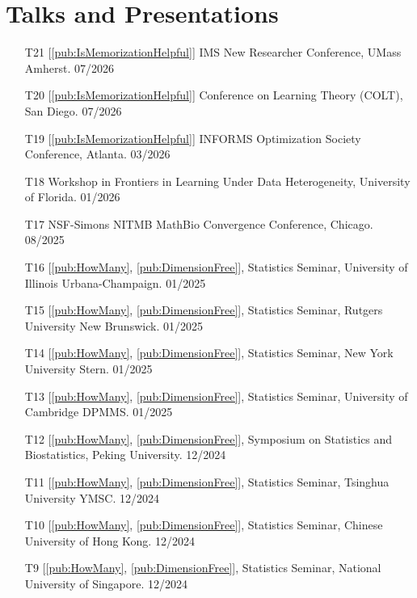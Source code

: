 \documentclass[10pt, a4paper]{article}
\makeatletter
\newcommand{\cvdategap}{\hspace{1.5em}\hfill}
\def\namedlabel#1#2{\begingroup
	#2%
	\def\@currentlabel{#2}%
	\phantomsection\label{#1}\endgroup
}
\makeatother
\begin{document}
\section*{\textbf{Talks and Presentations}}
\begin{enumerate}
	\item[\namedlabel{talk:IMS-26-4}{T21}] [\ref{pub:IsMemorizationHelpful}] IMS New Researcher Conference, UMass Amherst. \cvdategap 07/2026
	\item[\namedlabel{talk:COLT-26-3}{T20}] [\ref{pub:IsMemorizationHelpful}] Conference on Learning Theory (COLT), San Diego. \cvdategap 07/2026
	\item[\namedlabel{talk:IOC-26-2}{T19}] [\ref{pub:IsMemorizationHelpful}] INFORMS Optimization Society Conference, Atlanta. \cvdategap 03/2026
	\item[\namedlabel{talk:UF-26-1}{T18}] Workshop in Frontiers in Learning Under Data Heterogeneity, University of Florida. \cvdategap 01/2026
	\item[\namedlabel{talk:NITMB-25-8}{T17}] NSF-Simons NITMB MathBio Convergence Conference, Chicago. \cvdategap 08/2025
	\item[\namedlabel{talk:UIUC-25-1}{T16}] [\ref{pub:HowMany}, \ref{pub:DimensionFree}], Statistics Seminar, University of Illinois Urbana-Champaign. \cvdategap 01/2025
	\item[\namedlabel{talk:Rutgers-25-1}{T15}] [\ref{pub:HowMany}, \ref{pub:DimensionFree}], Statistics Seminar, Rutgers University New Brunswick. \cvdategap 01/2025
	\item[\namedlabel{talk:NYU-25-1}{T14}] [\ref{pub:HowMany}, \ref{pub:DimensionFree}], Statistics Seminar, New York University Stern. \cvdategap 01/2025
	\item[\namedlabel{talk:Cambridge-25-1}{T13}] [\ref{pub:HowMany}, \ref{pub:DimensionFree}], Statistics Seminar, University of Cambridge DPMMS. \cvdategap 01/2025
	\item[\namedlabel{talk:PKU-24-1}{T12}] [\ref{pub:HowMany}, \ref{pub:DimensionFree}], Symposium on Statistics and Biostatistics, Peking University. \cvdategap 12/2024
	\item[\namedlabel{talk:THU-24-1}{T11}] [\ref{pub:HowMany}, \ref{pub:DimensionFree}], Statistics Seminar, Tsinghua University YMSC. \cvdategap 12/2024
	\item[\namedlabel{talk:CUHK-24-1}{T10}] [\ref{pub:HowMany}, \ref{pub:DimensionFree}], Statistics Seminar, Chinese University of Hong Kong. \cvdategap 12/2024
	\item[\namedlabel{talk:NUS-24-1}{T9}] [\ref{pub:HowMany}, \ref{pub:DimensionFree}], Statistics Seminar, National University of Singapore. \cvdategap 12/2024

\end{enumerate}
\end{document}
